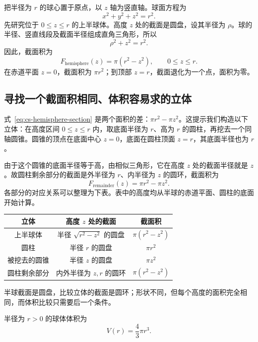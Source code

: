 \documentclass[UTF8,12pt,a4paper,fontset=fandol]{ctexart}
\begin{document}
把半径为 $r$ 的球心置于原点，以 $z$ 轴为竖直轴。球面方程为
\[
  x^2+y^2+z^2=r^2.
\]
先研究位于 $0\leq z\leq r$ 的上半球体。高度 $z$ 处的截面是圆盘，设其半径为 $\rho$。球的半径、竖直线段及截面半径组成直角三角形，所以
\[
  \rho^2+z^2=r^2.
\]
因此，截面积为
\begin{equation}\label{eq:cs-hemisphere-section}
  F_{\mathrm{hemisphere}}(z)=\pi(r^2-z^2),
  \qquad 0\leq z\leq r.
\end{equation}
在赤道平面 $z=0$，截面积为 $\pi r^2$；到顶部 $z=r$，截面退化为一个点，面积为零。

\subsection{寻找一个截面积相同、体积容易求的立体}

式~\eqref{eq:cs-hemisphere-section} 是两个面积的差：$\pi r^2-\pi z^2$。这提示我们构造以下立体：在高度区间 $0\leq z\leq r$ 内，取底面半径为 $r$、高为 $r$ 的圆柱，再挖去一个同轴圆锥。圆锥的顶点在底面中心 $z=0$，底面在圆柱顶面 $z=r$，其底面半径也为 $r$。

由于这个圆锥的底面半径等于高，由相似三角形，它在高度 $z$ 处的截面半径就是 $z$。故圆柱剩余部分的截面是外半径为 $r$、内半径为 $z$ 的圆环，截面积为
\[
  F_{\mathrm{remainder}}(z)=\pi r^2-\pi z^2.
\]
各部分的对应关系可以整理为下表。表中的高度均从半球的赤道平面、圆柱的底面开始计算。
\begin{center}
\begin{tabular}{c c c}
\toprule
立体 & 高度 $z$ 处的截面 & 截面积 \\
\midrule
上半球体 & 半径 $\sqrt{r^2-z^2}$ 的圆盘 & $\pi(r^2-z^2)$ \\
圆柱 & 半径 $r$ 的圆盘 & $\pi r^2$ \\
被挖去的圆锥 & 半径 $z$ 的圆盘 & $\pi z^2$ \\
圆柱剩余部分 & 内外半径为 $z,r$ 的圆环 & $\pi(r^2-z^2)$ \\
\bottomrule
\end{tabular}
\end{center}
半球截面是圆盘，比较立体的截面是圆环；形状不同，但每个高度的面积完全相同，而体积比较只需要后一个条件。

\begin{theorem}[球体积]
半径为 $r>0$ 的球体体积为
\begin{equation}\label{eq:cs-sphere-volume}
  \boxed{V(r)=\frac43\pi r^3}.
\end{equation}
\end{theorem}
\end{document}

